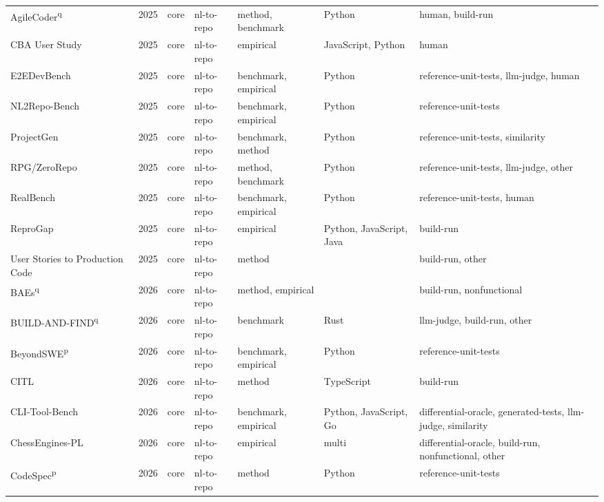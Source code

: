 {\begin{longtable}{@{}p{2.8cm}lllp{1.9cm}p{1.5cm}p{2.9cm}@{}}
AgileCoder\textsuperscript{q}~\cite{AgileCoder2025} & 2025 & core & nl-to-repo & method, benchmark & Python & human, build-run \\
CBA User Study~\cite{CBAUserStudy2025} & 2025 & core & nl-to-repo & empirical & JavaScript, Python & human \\
E2EDevBench~\cite{E2EDevBench2025} & 2025 & core & nl-to-repo & benchmark, empirical & Python & reference-unit-tests, llm-judge, human \\
NL2Repo-Bench~\cite{NL2RepoBench2025} & 2025 & core & nl-to-repo & benchmark, empirical & Python & reference-unit-tests \\
ProjectGen~\cite{ProjectGen2025} & 2025 & core & nl-to-repo & benchmark, method & Python & reference-unit-tests, similarity \\
RPG/ZeroRepo~\cite{RPGZeroRepo2025} & 2025 & core & nl-to-repo & method, benchmark & Python & reference-unit-tests, llm-judge, other \\
RealBench~\cite{RealBench2025} & 2025 & core & nl-to-repo & benchmark, empirical & Python & reference-unit-tests, human \\
ReproGap~\cite{ReproGap2025} & 2025 & core & nl-to-repo & empirical & Python, JavaScript, Java & build-run \\
User Stories to Production Code~\cite{UserStoriestoProductionC2025} & 2025 & core & nl-to-repo & method &  & build-run, other \\
BAEs\textsuperscript{q}~\cite{BAEs2026} & 2026 & core & nl-to-repo & method, empirical &  & build-run, nonfunctional \\
BUILD-AND-FIND\textsuperscript{q}~\cite{BUILDANDFIND2026} & 2026 & core & nl-to-repo & benchmark & Rust & llm-judge, build-run, other \\
BeyondSWE\textsuperscript{p}~\cite{BeyondSWE2026} & 2026 & core & nl-to-repo & benchmark, empirical & Python & reference-unit-tests \\
CITL~\cite{CITL2026} & 2026 & core & nl-to-repo & method & TypeScript & build-run \\
CLI-Tool-Bench~\cite{CLIToolBench2026} & 2026 & core & nl-to-repo & benchmark, empirical & Python, JavaScript, Go & differential-oracle, generated-tests, llm-judge, similarity \\
ChessEngines-PL~\cite{ChessEnginesPL2026} & 2026 & core & nl-to-repo & empirical & multi & differential-oracle, build-run, nonfunctional, other \\
CodeSpec\textsuperscript{p}~\cite{CodeSpec2026} & 2026 & core & nl-to-repo & method & Python & reference-unit-tests \\

\end{longtable}}
